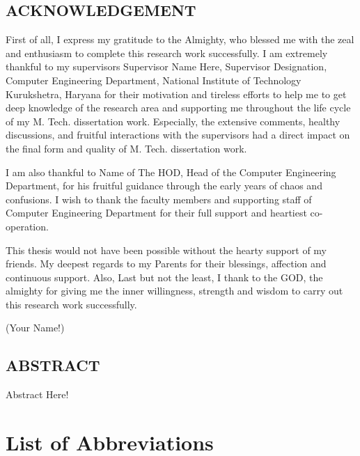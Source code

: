 \documentclass[12pt,a4paper]{report}
\begin{document}
\begin{center}
	\section*{ACKNOWLEDGEMENT}
	\noindent{\rule{\textwidth}{1.5pt}}
\end{center}
First of all, I express my gratitude to the Almighty, who blessed me with the zeal and enthusiasm to complete this research work successfully. I am extremely thankful to my supervisors Supervisor Name Here, Supervisor Designation, Computer Engineering Department, National Institute of Technology Kurukshetra, Haryana for their motivation and tireless efforts to help me to get deep knowledge of the research area and supporting me throughout the life cycle of my M. Tech. dissertation work.  Especially, the extensive comments, healthy discussions, and fruitful interactions with the supervisors had a direct impact on the final form and quality of M. Tech. dissertation work.
\par	
I am also thankful to Name of The HOD, Head of the Computer Engineering Department, for his fruitful guidance through the early years of chaos and confusions. I wish to thank the faculty members and supporting staff of Computer Engineering Department for their full support and heartiest co-operation.	
\par
This thesis would not have been possible without the hearty support of my friends. My deepest regards to my Parents for their blessings, affection and continuous support. Also, Last but not the least, I thank to the GOD, the almighty for giving me the inner willingness, strength and wisdom to carry out this research work successfully.
\begin{flushright}
	(Your Name!)
\end{flushright}
\clearpage
\section*{ABSTRACT}
\noindent{\rule{\textwidth}{1.5pt}}
Abstract Here!
\clearpage

\tableofcontents
\listoffigures
{}

\listoftables
{}

\listofalgorithms
{}

\chapter*{List of Abbreviations}
\begin{acronym}[TDMA]
	\setlength{\itemsep}{-\parsep}
\end{acronym}
\end{document}
